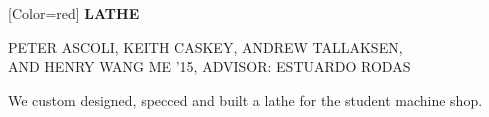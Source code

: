 \documentclass{article}
\begin{document}
{
	[Color=red]
	\fontsize{1in}{0.9in}\selectfont 
	\bfseries
	\noindent
	LATHE
}

\vspace{0.25in}

{
	\fontsize{0.55in}{0.6in}\selectfont
	\noindent
	PETER ASCOLI, KEITH CASKEY, ANDREW TALLAKSEN, \\ AND HENRY WANG
}
{
	\fontsize{0.4in}{0.4in}\selectfont
	ME '15, ADVISOR: ESTUARDO RODAS
}

\vspace{0.2in}

{
	\fontsize{0.4in}{0.4in}\selectfont
	\noindent
	We custom designed, specced and built a lathe for the student machine shop. 
}
\end{document}
